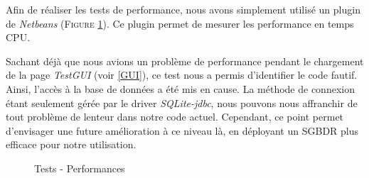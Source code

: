 Afin de réaliser les tests de performance, nous avons simplement utilisé un plugin de \textit{Netbeans} (\textsc{Figure} \ref{perf}). Ce plugin permet de mesurer les performance en temps CPU.

Sachant déjà que nous avions un problème de performance pendant le chargement de la page \textit{TestGUI} (voir \ref{GUI}), ce test nous a permis d'identifier le code fautif.
Ainsi, l'accès à la base de données a été mis en cause. La méthode de connexion étant seulement gérée par le driver \textit{SQLite-jdbc}, nous pouvons nous affranchir de tout problème de lenteur dans notre code actuel. Cependant, ce point permet d'envisager une future amélioration à ce niveau là, en déployant un SGBDR plus efficace pour notre utilisation.

\begin{figure}[!ht]
\begin{center}
  \caption{Tests - Performances}
  \label{perf} 
\end{center}
\end{figure}






